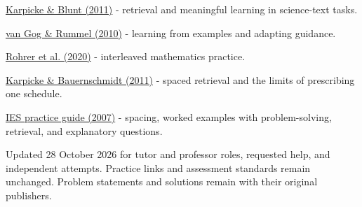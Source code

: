 \documentclass[11pt,letterpaper]{article}
\begin{document}
\href{https://pubmed.ncbi.nlm.nih.gov/21252317/}{Karpicke \& Blunt (2011)} - retrieval and meaningful learning in science-text tasks.

\href{https://link.springer.com/article/10.1007/s10648-010-9134-7}{van Gog \& Rummel (2010)} - learning from examples and adapting guidance.

\href{https://doi.org/10.1037/EDU0000367}{Rohrer et al. (2020)} - interleaved mathematics practice.

\href{https://pubmed.ncbi.nlm.nih.gov/21574747/}{Karpicke \& Bauernschmidt (2011)} - spaced retrieval and the limits of prescribing one schedule.

\href{https://ies.ed.gov/ncee/wwc/PracticeGuide/1}{IES practice guide (2007)} - spacing, worked examples with problem-solving, retrieval, and explanatory questions.

Updated 28 October 2026 for tutor and professor roles, requested help, and independent attempts. Practice links and assessment standards remain unchanged. Problem statements and solutions remain with their original publishers.
\end{document}
